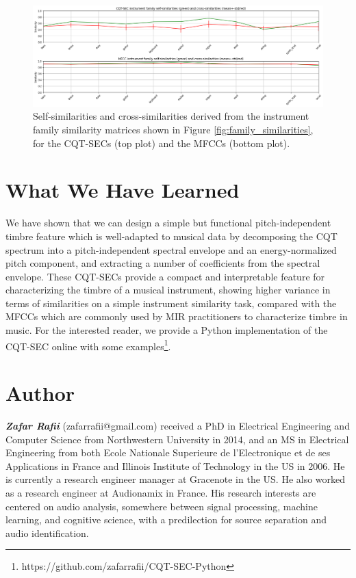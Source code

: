 \documentclass[journal]{IEEEtran}
\begin{document}
\begin{figure}[htp]
    \centering
    \includegraphics[width=\textwidth]{family_similarities2.png}
    \caption{Self-similarities and cross-similarities derived from the instrument family similarity matrices shown in Figure \ref{fig:family_similarities}, for the CQT-SECs (top plot) and the MFCCs (bottom plot).}
    \label{fig:family_similarities2}
\end{figure}


\section{What We Have Learned}

We have shown that we can design a simple but functional pitch-independent timbre feature which is well-adapted to musical data by decomposing the CQT spectrum into a pitch-independent spectral envelope and an energy-normalized pitch component, and extracting a number of coefficients from the spectral envelope. These CQT-SECs provide a compact and interpretable feature for characterizing the timbre of a musical instrument, showing higher variance in terms of similarities on a simple instrument similarity task, compared with the MFCCs which are commonly used by MIR practitioners to characterize timbre in music. For the interested reader, we provide a Python implementation of the CQT-SEC online with some examples\footnote{https://github.com/zafarrafii/CQT-SEC-Python}.


\section{Author}

\textit{\textbf{Zafar Rafii}} (zafarrafii@gmail.com) received a PhD in Electrical Engineering and Computer Science from Northwestern University in 2014, and an MS in Electrical Engineering from both Ecole Nationale Superieure de l’Electronique et de ses Applications in France and Illinois Institute of Technology in the US in 2006. He is currently a research engineer manager at Gracenote in the US. He also worked as a research engineer at Audionamix in France. His research interests are centered on audio analysis, somewhere between signal processing, machine learning, and cognitive science, with a predilection for source separation and audio identification.



\end{document}
